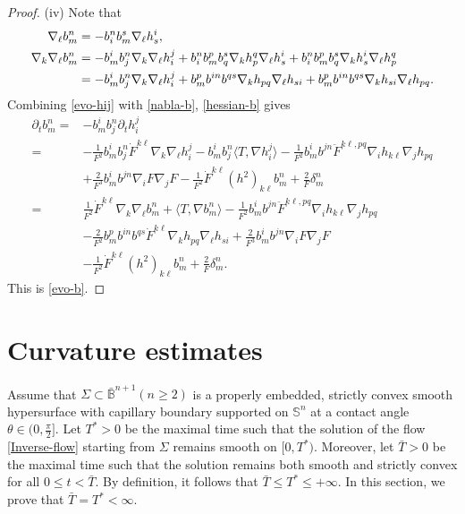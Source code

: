 \documentclass[11pt,reqno]{amsart}
\theoremstyle{definition}
\theoremstyle{remark}
\numberwithin{equation}{section}
\renewcommand{\(}{\left(}
\renewcommand{\)}{\right)}
\renewcommand{\-}{\overline}
\begin{document}
\begin{proof}
(iv) Note that 
\begin{align}
	\nabla_{\ell}{b_m^n}&=-b_i^n b_m^s\nabla_{\ell} h_s^i,\label{nabla-b}\\
	\nabla_k\nabla_{\ell}{b_m^n}&=-b_m^i b_j^n\nabla_k\nabla_{\ell}{h_i^j}+b_i^n b_m^p b_q^s\nabla_k{h_p^q}\nabla_{\ell}{h_s^i}+b_i^n b_m^p b_q^s\nabla_k{h_s^i}\nabla_{\ell}{h_p^q}\notag\\
	&=-b_m^i b_j^n\nabla_k\nabla_{\ell}{h_i^j}+b_m^p b^{in} b^{qs}\nabla_k{h_{pq}}\nabla_{\ell}{h_{si}}+b_m^p b^{in} b^{qs}\nabla_k{h_{si}}\nabla_{\ell}{h_{pq}}.\label{hessian-b}
\end{align}
Combining \eqref{evo-hij} with \eqref{nabla-b}, \eqref{hessian-b} gives
\begin{align*}
	\partial_t b_m^n=&-b_m^i b_j^n\partial_t{h_i^j}\\
	=&-\frac{1}{F^2}b_m^i b_j^n\dot{F}^{k\ell}\nabla_k\nabla_{\ell}{h_i^j}-b_m^i b_j^n\langle T,\nabla h_i^j \rangle-\frac{1}{F^2}b_m^i b^{jn}\ddot{F}^{k\ell,pq}\nabla_i{h_{k\ell}}\nabla_j{h_{pq}}\\
	&+\frac{2}{F^3}b_m^i b^{jn}\nabla_i F\nabla_j F-\frac{1}{F^2}\dot{F}^{k\ell}(h^2)_{k\ell}b_m^n+\frac{2}{F}\delta_m^n\\
	=&\frac{1}{F^2}\dot{F}^{k\ell}\nabla_k\nabla_{\ell}{b_m^n}+\langle T,\nabla{b_m^n} \rangle-\frac{1}{F^2}b_m^i b^{jn}\ddot{F}^{k\ell,pq}\nabla_i{h_{k\ell}}\nabla_j{h_{pq}}\\
	&-\frac{2}{F^2}b_m^p b^{in} b^{qs} \dot{F}^{k\ell}\nabla_k{h_{pq}}\nabla_{\ell}{h_{si}}+\frac{2}{F^3}b_m^i b^{jn}\nabla_i F\nabla_j F\\
	&-\frac{1}{F^2}\dot{F}^{k\ell}(h^2)_{k\ell}b_m^n+\frac{2}{F}\delta_m^n.
\end{align*}
This is \eqref{evo-b}.
\end{proof}
\section{Curvature estimates}\label{Sec-cur}
Assume that $\Sigma\subset\bar{\mathbb{B}}^{n+1} (n\geq 2)$ is a properly embedded, strictly convex smooth hypersurface with capillary boundary supported on $\mathbb{S}^n$ at a contact angle $\theta\in(0,\frac{\pi}{2}]$. Let $T^{*}>0$ be the maximal time such that the solution of the flow \eqref{Inverse-flow} starting from $\Sigma$ remains smooth on $[0,T^{*})$. Moreover, let $\bar{T}>0$ be the maximal time such that the solution remains both smooth and strictly convex for all $0\leq t<\bar{T}$. By definition, it follows that $\bar{T}\leq T^{*}\leq +\infty$. In this section, we prove that $\bar{T}=T^{*}<\infty$.
\end{document}
